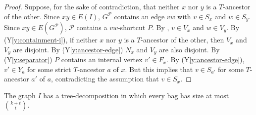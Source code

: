 \documentclass{patmorin}
\newcommand{\yref}[1]{(Y\ref{y:#1})}
\begin{document}
\begin{proof}
  Suppose, for the sake of contradiction, that neither $x$ nor $y$ is a $T$-ancestor of the other.  Since $xy\in E(I)$, $G^\mathcal{P}$ contains an edge $vw$ with $v\in S_x$ and $w\in S_y$.  Since $xy\in E(G^{\mathcal{P}})$,  $\mathcal{P}$ contains a $vw$-shortcut $P$.  By , $v\in V_x$ and $w\in V_y$.  By \yref{containment-i}, if neither $x$ nor $y$ is a $T$-ancestor of the other, then $V_x$ and $V_y$ are disjoint.  By \yref{ancestor-edge} $N_x$ and $V_y$ are also disjoint.  By \yref{separator} $P$ contains an internal vertex $v'\in F_x$.  By \yref{ancestor-edge}, $v'\in Y_a$ for some strict $T$-ancestor $a$ of $x$.  But this implies that $v\in S_{a'}$ for some $T$-ancestor $a'$ of $a$, contradicting the assumption that $v\in S_x$.
\end{proof}

\begin{clm}
  The graph $I$ has a tree-decomposition in which every bag has size at most $\binom{k+t}{t}$.
\end{clm}
\end{document}
